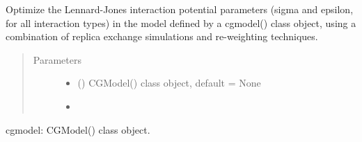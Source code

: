 \documentclass[letterpaper,12pt,english,openany,oneside]{sphinxmanual}
\begin{document}

\begin{fulllineitems}
\label{\detokenize{parameters:parameters.optimize.optimize_heat_capacity}}
\end{fulllineitems}


\begin{fulllineitems}
\label{\detokenize{parameters:parameters.optimize.optimize_lj}}
Optimize the Lennard-Jones interaction potential parameters (sigma and epsilon, for all interaction types) in the model defined by a cgmodel() class object, using a combination of replica exchange simulations and re-weighting techniques.
\begin{quote}\begin{description}
\item[{Parameters}] \leavevmode\begin{itemize}
\item {} 
 () \textendash{} CGModel() class object, default = None

\item {} 
 \textendash{} 

\end{itemize}

\end{description}\end{quote}

cgmodel: CGModel() class object.

\end{fulllineitems}

\end{document}
